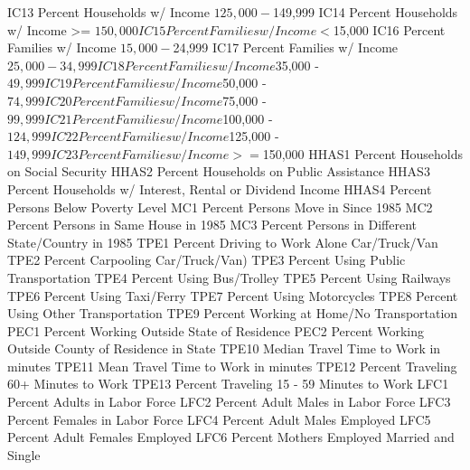 \documentclass[
  11pt,
  a4paper,
  DIV=12,captions=tableheading,oneside,titlepage]{scrbook}
\let\oldverbatim\verbatim
\let\endoldverbatim\endverbatim
\renewenvironment{verbatim}{\footnotesize\oldverbatim}{\endoldverbatim}
\begin{document}
\begin{verbatim}
IC13                        Percent Households w/ Income $125,000 - $149,999
IC14                        Percent Households w/ Income >= $150,000
IC15                        Percent Families w/ Income < $15,000
IC16                        Percent Families w/ Income $15,000 - $24,999
IC17                        Percent Families w/ Income $25,000 - 34,999
IC18                        Percent Families w/ Income $35,000 - $49,999
IC19                        Percent Families w/ Income $50,000 - $74,999
IC20                        Percent Families w/ Income $75,000 - $99,999
IC21                        Percent Families w/ Income $100,000 - $124,999
IC22                        Percent Families w/ Income $125,000 - $149,999
IC23                        Percent Families w/ Income >= $150,000
HHAS1                       Percent Households on Social Security
HHAS2                       Percent Households on Public Assistance
HHAS3                       Percent Households w/ Interest, Rental or Dividend Income
HHAS4                       Percent Persons Below Poverty Level
MC1                         Percent Persons Move in Since 1985
MC2                         Percent Persons in Same House in 1985
MC3                         Percent Persons in Different State/Country in 1985
TPE1                        Percent Driving to Work Alone Car/Truck/Van
TPE2                        Percent Carpooling Car/Truck/Van)
TPE3                        Percent Using Public Transportation
TPE4                        Percent Using Bus/Trolley
TPE5                        Percent Using Railways
TPE6                        Percent Using Taxi/Ferry
TPE7                        Percent Using Motorcycles
TPE8                        Percent Using Other Transportation
TPE9                        Percent Working at Home/No Transportation
PEC1                        Percent Working Outside State of Residence
PEC2                        Percent Working Outside County of Residence in State
TPE10                       Median Travel Time to Work in minutes
TPE11                       Mean Travel Time to Work in minutes
TPE12                       Percent Traveling 60+ Minutes to Work
TPE13                       Percent Traveling 15 - 59 Minutes to Work
LFC1                        Percent Adults in Labor Force
LFC2                        Percent Adult Males in Labor Force
LFC3                        Percent Females in Labor Force
LFC4                        Percent Adult Males Employed
LFC5                        Percent Adult Females Employed
LFC6                        Percent Mothers Employed Married and Single

\end{verbatim}
\end{document}
